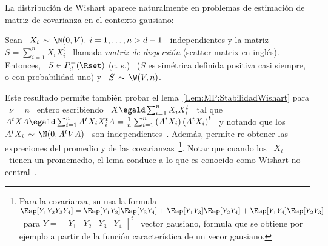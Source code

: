 La distribuci\'on  de Wishart aparece naturalmente en  problemas de estimaci\'on
de matriz de covarianza en el contexto gausiano:
%
\begin{lema}
  Sean \ $X_i \, \sim \, \N(0,V), \: i = 1, \ldots , n > d-1$ \ independientes y
  la  matriz  \  $S  =  \sum_{i=1}^n   X_i  X_i^t$  \  llamada  {\em  matriz  de
    dispersi\'on} (scatter matrix en ingl\'es). Entonces, \ $S \in P_d^+(\Rset)$
  (c.   s.)   \  ($S$ es  sim\'etrica  definida  positiva  casi siempre,  o  con
  probabilidad uno) y \ $S \,\sim \, \W(V,n)$.
\end{lema}
%
Este resultado  permite tambi\'en probar  el lema~\ref{Lem:MP:StabilidadWishart}
para \ $\nu = n$ \ entero  escribiendo \ $X \egald \sum_{i=1}^n X_i X_i^t$ \ tal
que \ $A^t X A \egald \sum_{i=1}^n A^t X_i X_i^t A = \frac1n \sum_{i=1}^n \left(
  A^t X_i \right)  \left( A^t X_i \right)^t$ \  y notando que los \  $A^t X_i \,
\sim \,  \N(0, A^t V  A)$ \ son independientes~\cite{Seb04}.   Adem\'as, permite
re-obtener las  expreciones del promedio y de  las covarianzas~\footnote{Para la
  covarianza, su usa la formula \ $\Esp[Y_1 Y_2 Y_3 Y_4] = \Esp[Y_1 Y_2]\Esp[Y_3
  Y_4]  + \Esp[Y_1 Y_3]\Esp[Y_2  Y_4] +  \Esp[Y_1 Y_4]\Esp[Y_2  Y_3]$ \  para $Y
  = \begin{bmatrix}  Y_1 & Y_2 &  Y_3 & Y_4 \end{bmatrix}^t$  \ vector gausiano,
  formula que se  obtiene por ejemplo a partir  de la funci\'on caracter\'istica
  de un vecor  gausiano.}. Notar que cuando los \ $X_i$  \ tienen un promemedio,
el  lema conduce  a  lo que  es  conocido como  Wishart no  central~\cite{And03,
  Seb04}.

